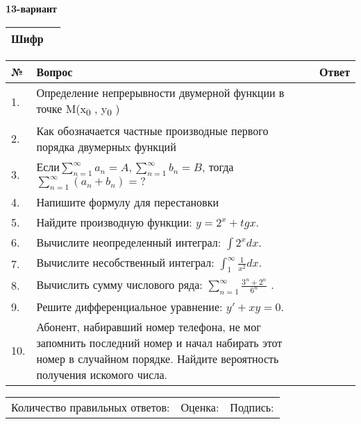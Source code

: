\documentclass{article}
\begin{document}
  \egroup
  
  \newpage
  
  
  \textbf{13-вариант}\\
  
  \bgroup
  \def\arraystretch{1.6} %
  
  \begin{tabular}{|m{5.7cm}|m{9.5cm}|}
  \hline
  Шифр & \\
  \hline
  \end{tabular}
  
  \vspace{1cm}
  
  \begin{tabular}{|m{0.7cm}|m{10cm}|m{4cm}|}
  \hline
  № & Вопрос & Ответ \\
  \hline
  1. & Определение непрерывности двумерной функции в точке M(x\textsubscript{0} , y\textsubscript{0} ) &  \\
  \hline
  2. & Как обозначается частные производные первого порядка двумерныx функций &  \\
  \hline
  3. & Если\(\sum_{n = 1}^{\infty}a_{n} = A,\sum_{n = 1}^{\infty}b_{n} = B\), тогда \(\sum_{n = 1}^{\infty}\left( a_{n} + b_{n} \right) = ?\) &  \\
  \hline
  4. & Напишите формулу для перестановки &  \\
  \hline
  5. & Найдите производную функции: \(y = 2^{x} + tgx\). &  \\
  \hline
  6. & Вычислите неопределенный интеграл: \(\int2^{x}dx\). &  \\
  \hline
  7. & Вычислите несобственный интеграл: \(\int_{1}^{\infty}{\frac{1}{x^{2}}dx}\). &  \\
  \hline
  8. & Вычислить сумму числового ряда: \(\sum_{n = 1}^{\infty}\frac{3^{n} + 2^{n}}{6^{n}}\) . &  \\
  \hline
  9. & Решите дифференциальное уравнение: \(y' + xy = 0\). &  \\
  \hline
  10. & Абонент, набиравший номер телефона, не мог запомнить последний номер и начал набирать этот номер в случайном порядке. Найдите вероятность получения искомого числа. &  \\
  \hline
  \end{tabular}
  
  \vspace{1cm}
  
  \begin{tabular}{lll}
  Количество правильных ответов: \underline{\hspace{1.5cm}} & 
  Оценка: \underline{\hspace{1.5cm}} & 
  Подпись: \underline{\hspace{2cm}} \\
  \end{tabular}
  
\end{document}
